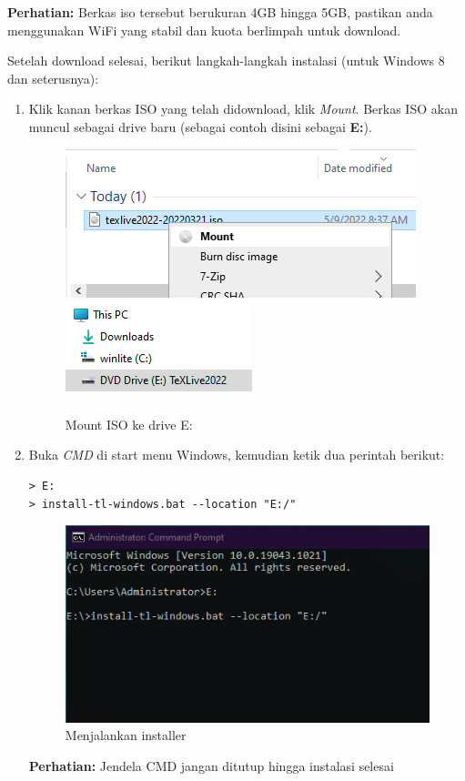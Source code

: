 \documentclass{book} %
\begin{document}
	\bigskip

	\textbf{Perhatian:} Berkas iso tersebut berukuran 4GB hingga 5GB, pastikan anda menggunakan WiFi yang stabil dan kuota berlimpah untuk download.

	\newpage

	Setelah download selesai, berikut langkah-langkah instalasi (untuk Windows 8 dan seterusnya):

	\begin{enumerate}
		\item Klik kanan berkas ISO yang telah didownload, klik \textit{Mount}.
		Berkas ISO akan muncul sebagai drive baru (sebagai contoh disini sebagai \textbf{E:}).
		\begin{figure}[!ht]
			\centering
			\includegraphics[width=0.3\linewidth]{images/texlivewin0}
			\includegraphics[width=0.3\linewidth]{images/texlivewin1}
			\caption{Mount ISO ke drive E:}
		\end{figure}

		\item Buka \textit{CMD} di start menu Windows, kemudian ketik dua perintah berikut:
		\begin{verbatim}
> E:
> install-tl-windows.bat --location "E:/"
		\end{verbatim}

		\begin{figure}[!ht]
			\centering
			\includegraphics[width=0.4\linewidth]{images/texlivewin2}
			\caption{Menjalankan installer}
		\end{figure}

		\textbf{Perhatian:} Jendela CMD jangan ditutup hingga instalasi selesai


\end{enumerate}
\end{document}
